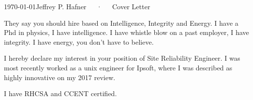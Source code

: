 \documentclass[11pt, a4paper]{awesome-cv}
\begin{document}
\makecvheader[R]

\makecvfooter
  {\today}{Jeffrey P. Hafner~~~·~~~Cover Letter}{}

\makelettertitle

\begin{cvletter}

They say you should hire based on Intelligence, Integrity and Energy.
I have a Phd in physics, I have intelligence.
I have whistle blow on a past employer, I have integrity.
I have energy, you don't have to believe.

I hereby declare my interest in  your position of Site Reliability Engineer.
I was most recently worked as a unix engineer for Ipsoft, where I was described as highly innovative on my 2017 review.

I have RHCSA and CCENT certified.










%

\end{cvletter}


\makeletterclosing

\end{document}
